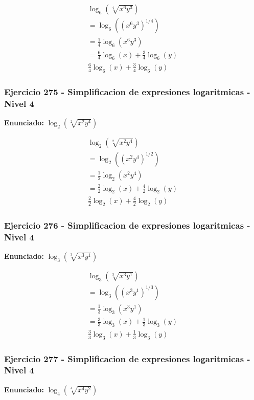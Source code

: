 \documentclass[12pt,a4paper]{article}
\begin{document}
\[
\begin{aligned}
\log_{6}\left(\sqrt[4]{x^{6}y^{3}}\right)\\
=\log_{6}\left((x^{6}y^{3})^{1/4}\right)\\
=\frac{1}{4}\log_{6}\left(x^{6}y^{3}\right) \\
=\frac{6}{4}\log_{6}\left(x\right)+\frac{3}{4}\log_{6}\left(y\right)\\
\boxed{\frac{6}{4}\log_{6}\left(x\right)+\frac{3}{4}\log_{6}\left(y\right)}
\end{aligned}
\]


\subsubsection*{Ejercicio 275 - Simplificacion de expresiones logaritmicas - Nivel 4}
\textbf{Enunciado:} \(\log_{2}\left(\sqrt[2]{x^{2}y^{4}}\right)\)

\[
\begin{aligned}
\log_{2}\left(\sqrt[2]{x^{2}y^{4}}\right)\\
=\log_{2}\left((x^{2}y^{4})^{1/2}\right)\\
=\frac{1}{2}\log_{2}\left(x^{2}y^{4}\right) \\
=\frac{2}{2}\log_{2}\left(x\right)+\frac{4}{2}\log_{2}\left(y\right)\\
\boxed{\frac{2}{2}\log_{2}\left(x\right)+\frac{4}{2}\log_{2}\left(y\right)}
\end{aligned}
\]


\subsubsection*{Ejercicio 276 - Simplificacion de expresiones logaritmicas - Nivel 4}
\textbf{Enunciado:} \(\log_{3}\left(\sqrt[3]{x^{3}y^{1}}\right)\)

\[
\begin{aligned}
\log_{3}\left(\sqrt[3]{x^{3}y^{1}}\right)\\
=\log_{3}\left((x^{3}y^{1})^{1/3}\right)\\
=\frac{1}{3}\log_{3}\left(x^{3}y^{1}\right) \\
=\frac{3}{3}\log_{3}\left(x\right)+\frac{1}{3}\log_{3}\left(y\right)\\
\boxed{\frac{3}{3}\log_{3}\left(x\right)+\frac{1}{3}\log_{3}\left(y\right)}
\end{aligned}
\]


\subsubsection*{Ejercicio 277 - Simplificacion de expresiones logaritmicas - Nivel 4}
\textbf{Enunciado:} \(\log_{4}\left(\sqrt[4]{x^{4}y^{2}}\right)\)
\end{document}
